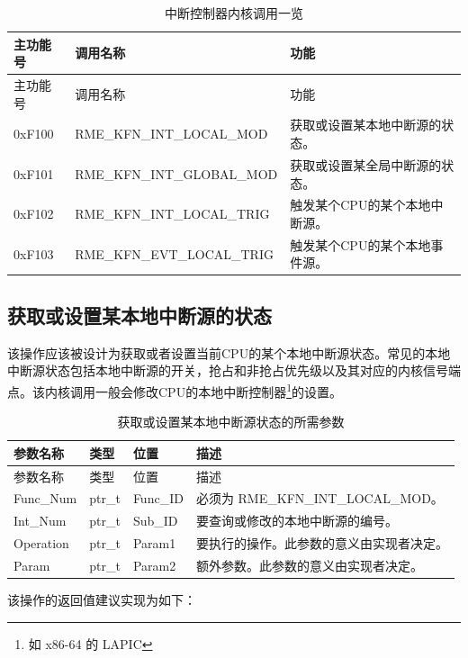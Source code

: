 \begin{xltabular}{\textwidth}{@{}>{\hsize\raggedright\arraybackslash}X>{\hsize\raggedright\arraybackslash}X>{\hsize\raggedright\arraybackslash}X@{}}
\caption{中断控制器内核调用一览}\label{tab:8-15-interrupt-controller-kernel-calls}\\
\toprule
主功能号 & 调用名称 & 功能\tabularnewline
\endfirsthead
\toprule
主功能号 & 调用名称 & 功能\tabularnewline
\midrule
\endhead
\bottomrule
\endlastfoot
0xF100 & RME\_KFN\_INT\_LOCAL\_MOD &
获取或设置某本地中断源的状态。\tabularnewline
0xF101 & RME\_KFN\_INT\_GLOBAL\_MOD &
获取或设置某全局中断源的状态。\tabularnewline
0xF102 & RME\_KFN\_INT\_LOCAL\_TRIG &
触发某个CPU的某个本地中断源。\tabularnewline
0xF103 & RME\_KFN\_EVT\_LOCAL\_TRIG &
触发某个CPU的某个本地事件源。\tabularnewline
\end{xltabular}

\subsection{获取或设置某本地中断源的状态}\label{subsec:8-get-or-set-local-interrupt-source-state}

该操作应该被设计为获取或者设置当前CPU的某个本地中断源状态。常见的本地中断源状态包括本地中断源的开关，抢占和非抢占优先级以及其对应的内核信号端点。该内核调用一般会修改CPU的本地中断控制器\footnote{如 x86-64 的 LAPIC}的设置。

\begin{xltabular}{\textwidth}{@{}>{\hsize\raggedright\arraybackslash}X>{\hsize\raggedright\arraybackslash}X>{\hsize\raggedright\arraybackslash}X>{\hsize\raggedright\arraybackslash}X@{}}
\caption{获取或设置某本地中断源状态的所需参数}\label{tab:8-16-get-or-set-local-interrupt-source-state-parameters}\\
\toprule
参数名称 & 类型 & 位置 & 描述\tabularnewline
\endfirsthead
\toprule
参数名称 & 类型 & 位置 & 描述\tabularnewline
\midrule
\endhead
\bottomrule
\endlastfoot
Func\_Num & ptr\_t & Func\_ID & 必须为 RME\_KFN\_INT\_LOCAL\_MOD。\tabularnewline
Int\_Num & ptr\_t & Sub\_ID &
要查询或修改的本地中断源的编号。\tabularnewline
Operation & ptr\_t & Param1 &
要执行的操作。此参数的意义由实现者决定。\tabularnewline
Param & ptr\_t & Param2 &
额外参数。此参数的意义由实现者决定。\tabularnewline
\end{xltabular}

该操作的返回值建议实现为如下：

